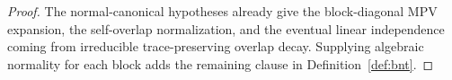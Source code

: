 \begin{proof}\leanok{}
    The normal-canonical hypotheses already give the block-diagonal MPV
    expansion, the self-overlap normalization, and the eventual linear
    independence coming from irreducible trace-preserving overlap decay.
    Supplying algebraic normality for each block adds the remaining clause in
    Definition~\ref{def:bnt}.
\end{proof}

